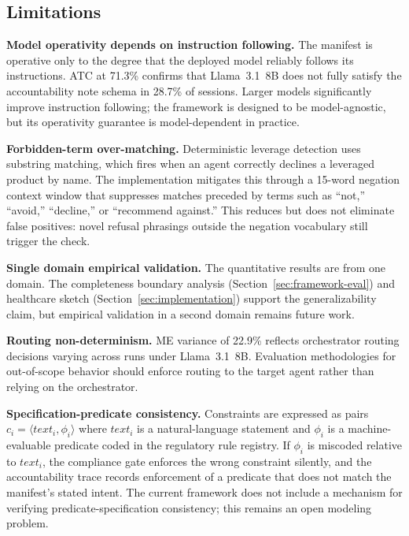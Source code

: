 \documentclass[runningheads]{llncs}
\begin{document}
\subsection{Limitations}

\textbf{Model operativity depends on instruction following.} The manifest
is operative only to the degree that the deployed model reliably follows
its instructions. ATC at 71.3\% confirms that Llama~3.1~8B does not
fully satisfy the accountability note schema in 28.7\% of sessions.
Larger models significantly improve instruction following; the framework
is designed to be model-agnostic, but its operativity guarantee is
model-dependent in practice.

\textbf{Forbidden-term over-matching.} Deterministic leverage detection
uses substring matching, which fires when an agent correctly declines a
leveraged product by name. The implementation mitigates this through a
15-word negation context window that suppresses matches preceded by terms
such as ``not,'' ``avoid,'' ``decline,'' or ``recommend against.'' This
reduces but does not eliminate false positives: novel refusal phrasings
outside the negation vocabulary still trigger the check.

\textbf{Single domain empirical validation.} The quantitative results
are from one domain. The completeness boundary analysis
(Section~\ref{sec:framework-eval}) and healthcare sketch
(Section~\ref{sec:implementation}) support the generalizability claim,
but empirical validation in a second domain remains future work.

\textbf{Routing non-determinism.} ME variance of 22.9\% reflects
orchestrator routing decisions varying across runs under Llama~3.1~8B.
Evaluation methodologies for out-of-scope behavior should enforce routing
to the target agent rather than relying on the orchestrator.

\textbf{Specification-predicate consistency.} Constraints are expressed
as pairs $c_i = \langle \mathit{text}_i, \phi_i \rangle$ where
$\mathit{text}_i$ is a natural-language statement and $\phi_i$ is a
machine-evaluable predicate coded in the regulatory rule registry. If
$\phi_i$ is miscoded relative to $\mathit{text}_i$, the compliance gate
enforces the wrong constraint silently, and the accountability trace
records enforcement of a predicate that does not match the manifest's
stated intent. The current framework does not include a mechanism for
verifying predicate-specification consistency; this remains an open
modeling problem.
\end{document}
